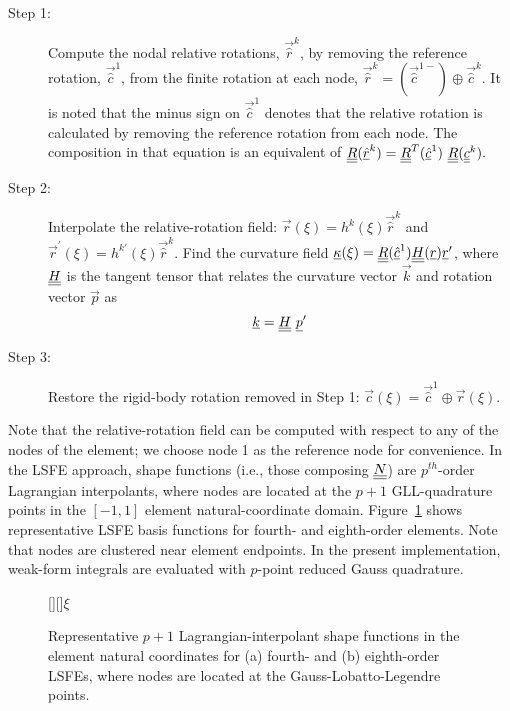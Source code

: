 \begin{description}

    \item[Step 1:] Compute the nodal relative rotations, $\vec{\hat{r}}^k$,
by removing the reference rotation, $\vec{\hat{c}}^1$, from the finite
rotation at each node, $\vec{\hat{r}}^k = (\vec{\hat{c}}^{1-}) \oplus
\vec{\hat{c}}^k$. It is noted that the minus sign on $\vec{\hat{c}}^1$ denotes that the relative rotation is calculated by removing the reference rotation from each node.  The composition in that equation is an equivalent of $\underline{\underline{R}}(\underline{\hat{r}}^k) = \underline{\underline{R}}^T(\underline{\hat{c}}^1)~\underline{\underline{R}}(\underline{\underline{c}}^k).$

    \item[Step 2:] Interpolate the relative-rotation field: $\vec{r}(\xi) = h^k(\xi) \vec{\hat{r}}^k$ and $\vec{r}^\prime(\xi) = h^{k \prime}(\xi) \vec{\hat{r}}^k$. Find the curvature field $\underline{\kappa}(\xi) = \underline{\underline{R}}(\underline{\hat{c}}^1) \underline{\underline{H}}(\underline{r}) \underline{r}^\prime$, where $\underline{\underline{H}}$ is the tangent tensor that relates the curvature vector $\vec{k}$ and rotation vector $\vec{p}$ as
\begin{equation}
    \label{Tensor}
    \underline{k} = \underline{\underline{H}}~ \underline{p}^\prime
\end{equation}

    \item[Step 3:] Restore the rigid-body rotation removed in Step 1: $\vec{c}(\xi) = \vec{\hat{c}}^1 \oplus \vec{r}(\xi)$.
\end{description} 


Note that the relative-rotation field can be computed with respect to any of
the nodes of the element; we choose node 1 as the reference node for
convenience. In the LSFE approach, shape functions (i.e., those composing $\underline{\underline{N}}$) are
$p^{th}$-order Lagrangian interpolants, where nodes are located at the $p+1$
GLL-quadrature points in the $[-1,1]$ element natural-coordinate domain.
Figure~\ref{fig:N4_lsfe} shows representative LSFE basis functions for  
fourth- and eighth-order elements.  Note that nodes are clustered near
element endpoints.
In the present implementation, weak-form integrals are evaluated with
$p$-point reduced Gauss quadrature.

\begin{figure}
    \centering
    [][]{$\xi$}
    \caption{Representative $p+1$ Lagrangian-interpolant shape functions in
the element natural coordinates for
(a) fourth- and (b) eighth-order LSFEs, where nodes are located at the
Gauss-Lobatto-Legendre points.}
    \label{fig:N4_lsfe}
\end{figure}

